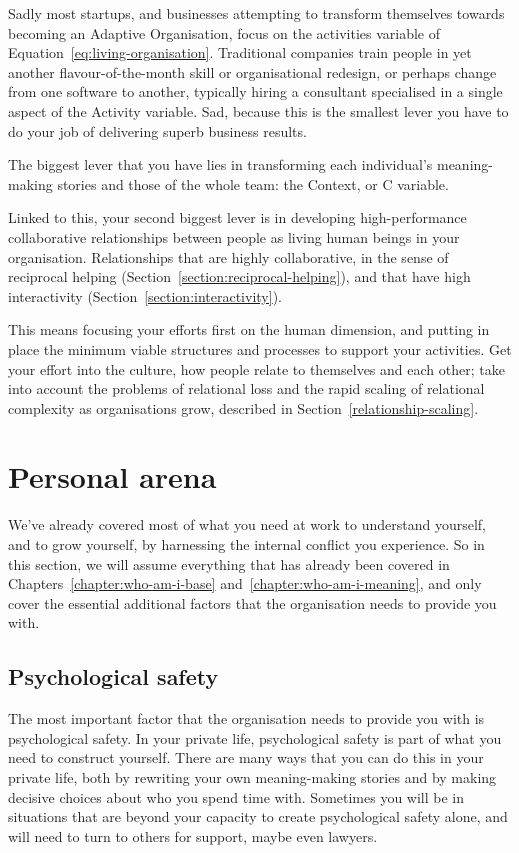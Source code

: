 Sadly most startups, and businesses attempting to transform themselves towards becoming an Adaptive Organisation,  focus on the activities variable of Equation~\ref{eq:living-organisation}. Traditional companies train people in yet another flavour-of-the-month skill or organisational redesign, or perhaps change from one software to another, typically hiring a consultant specialised in a single aspect of the Activity variable. Sad, because this is the smallest lever you have to do your job of delivering superb business results.


The biggest lever that you have lies in transforming each individual’s meaning\hyp{}making stories and those of the whole team: the Context, or C variable.


Linked to this, your second biggest lever is in developing high-performance collaborative relationships between people as living human beings in your organisation. Relationships that are highly collaborative, in the sense of reciprocal helping (Section~\ref{section:reciprocal-helping}), and that have high interactivity (Section~\ref{section:interactivity}).


This means focusing your efforts first on the human dimension, and putting in place the minimum viable structures and processes to support your activities. Get your effort into the culture, how people relate to themselves and each other; take into account the problems of relational loss and the rapid scaling of relational complexity as organisations grow, described in Section~\ref{relationship-scaling}.


\section{Personal arena}
\label{section:personal}
We've already covered most of what you need at work to understand yourself, and to grow yourself, by harnessing the internal conflict you experience. So in this section, we will assume everything that has already been covered in Chapters~\ref{chapter:who-am-i-base} and~\ref{chapter:who-am-i-meaning}, and only cover the essential additional factors that the organisation needs to provide you with.


\subsection{Psychological safety}
The most important factor that the organisation needs to provide you with is psychological safety. In your private life, psychological safety   is part of what you need to construct yourself. There are many ways that you can do this in your private life, both by rewriting your own meaning\hyp{}making stories and by making decisive choices about who you spend time with. Sometimes you will be in situations that are beyond your capacity to create psychological safety alone, and will need to turn to others for support, maybe even lawyers. 


